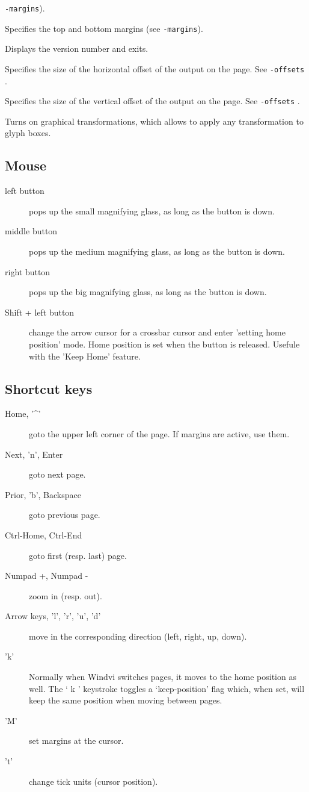 \documentclass[a4paper,11pt]{article}
\def\WDVI{\textsf{Windvi}}
\begin{document}
\begin{description}
  \texttt{-margins}).
\item[-topmargin <dimen>] Specifies the top and bottom margins (see
  \texttt{-margins}).
\item[-version] Displays the version number and exits.
\item[-xoffset <dimen>] Specifies the size of the horizontal offset of
  the output on the page. See \texttt{-offsets} .
\item[-yoffset <dimen>] Specifies the size of the vertical offset of
  the output on the page. See \texttt{-offsets} .
\item[-xform] Turns on graphical transformations, which allows to
  apply any transformation to glyph boxes.
\end{description}

\subsection{Mouse}
\begin{description}
\item[left button] pops up the small magnifying glass, as long as the
  button is down. 
\item[middle button] pops up the medium magnifying glass, as long as the
  button is down.
\item[right button] pops up the big magnifying glass, as long as the
  button is down.
\item[Shift + left button] change the arrow cursor for a crossbar
  cursor and enter 'setting home position' mode. Home position is set
  when the button is released. Usefule with the 'Keep Home' feature.
\end{description}
\subsection{Shortcut keys}

\begin{description}
\item[Home, '\textasciicircum'] goto the upper left corner of the
  page. If margins are active, use them.
\item[Next, 'n', Enter] goto next page.
\item[Prior, 'b', Backspace] goto previous page.
\item[Ctrl-Home, Ctrl-End] goto first (resp. last) page.
\item[Numpad +, Numpad -] zoom in (resp. out).
\item[Arrow keys, 'l', 'r', 'u', 'd'] move in the corresponding
  direction (left, right, up, down).
\item['k'] Normally when \WDVI{} switches pages, it moves to the home
  position as well.  The ` k ' keystroke toggles a `keep-position'
  flag which, when set, will keep the same position when moving
  between pages.
\item['M'] set margins at the cursor.
\item['t'] change tick units (cursor position).
\end{description}
\end{document}
